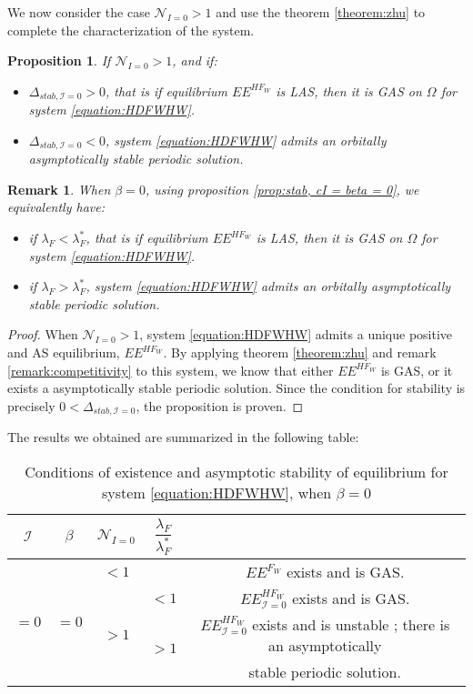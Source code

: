 \documentclass{article}
\newcommand{\lfw}{\lambda_{F}}
\newcommand{\lfw}{\lambda_{F}}
\newcommand{\cI}{\mathcal{I}}
\newtheorem{prop}{Proposition}
\newtheorem{remark}{Remark}
\begin{document}
We now consider the case $\mathcal{N}_{I = 0} > 1$ and use the theorem \ref{theorem:zhu} to complete the characterization of the system.

\begin{prop}\label{prop:limitCycle, cI=0}
If $\mathcal{N}_{I =0} > 1$, and if:
\begin{itemize}
\item $\Delta_{stab, \cI =0} > 0$, that is if equilibrium $EE^{HF_W}$ is LAS, then it is GAS on $\Omega$ for system \eqref{equation:HDFWHW}.
\item $\Delta_{stab, \cI =0} < 0$, system \eqref{equation:HDFWHW} admits an orbitally asymptotically stable periodic solution.
\end{itemize}
\end{prop}

\begin{remark}
When $\beta = 0$, using proposition \ref{prop:stab, cI = beta = 0}, we equivalently have:
\begin{itemize}
\item if $\lfw <  \lfw^*$, that is if equilibrium $EE^{HF_W}$ is LAS, then it is GAS on $\Omega$ for system \eqref{equation:HDFWHW}.
\item if $\lfw  > \lfw^*$, system \eqref{equation:HDFWHW} admits an orbitally asymptotically stable periodic solution.
\end{itemize}
\end{remark}

\begin{proof}
When $\mathcal{N}_{I =0} > 1$, system \eqref{equation:HDFWHW} admits a unique positive and AS equilibrium, $EE^{HF_W}$. By applying theorem \ref{theorem:zhu} and remark \ref{remark:competitivity} to this system, we know that either $EE^{HF_W}$ is GAS, or it exists a asymptotically stable periodic solution. Since the condition for stability is precisely $0 < \Delta_{stab, \cI =0}$, the proposition is proven. 
\end{proof}

The results we obtained are summarized in the following table:

\begin{table}[!ht]
\centering
\def\arraystretch{2}
\begin{tabular}{c|c|c|c|c}
$\cI$ &$\beta$ & $\mathcal{N}_{I =0}$ &  $\dfrac{\lfw}{  \lfw ^*}$ & \\
\hline
\multirow{4}{*}{$=0$}&\multirow{4}{*}{$=0$} & $ < 1$ & &$EE^{F_W}$ exists and is GAS.  \\
\cline{3-5}
 & & \multirow{3}{*}{$> 1$} & $ <1$ &$EE^{HF_W}_{\cI=0}$ exists and is GAS.\\
 \cline{4-5}
 & & &\multirow{2}{*}{$ > 1$} & $EE^{HF_W}_{\cI=0}$ exists and is unstable ; there is an asymptotically \\
& & & &  stable periodic solution.
\end{tabular}
\caption{\centering Conditions of existence and asymptotic stability of equilibrium for system \eqref{equation:HDFWHW}, when $\beta = 0$}
\end{table}
\end{document}
